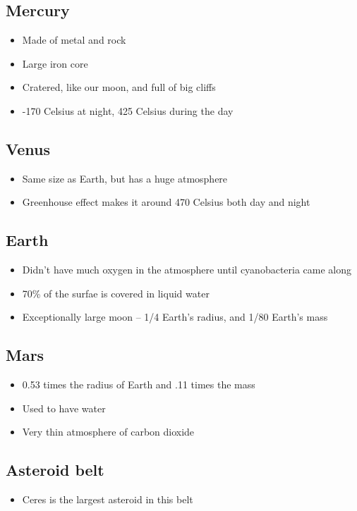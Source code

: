 \documentclass[class=article, crop=false]{standalone}
\begin{document}
\subsection{Mercury}
\begin{itemize}
    \item Made of metal and rock
    \item Large iron core
    \item Cratered, like our moon, and full of big cliffs
    \item -170 Celsius at night, 425 Celsius during the day
\end{itemize}
\subsection{Venus}
\begin{itemize}
    \item Same size as Earth, but has a huge atmosphere
    \item Greenhouse effect makes it around 470 Celsius both day and night
\end{itemize}
\subsection{Earth}
\begin{itemize}
    \item Didn't have much oxygen in the atmosphere until cyanobacteria came along
    \item 70\% of the surfae is covered in liquid water
    \item Exceptionally large moon -- 1/4 Earth's radius, and 1/80 Earth's mass
\end{itemize}
\subsection{Mars}
\begin{itemize}
    \item 0.53 times the radius of Earth and .11 times the mass
    \item Used to have water
    \item Very thin atmosphere of carbon dioxide
\end{itemize}
\subsection{Asteroid belt}
\begin{itemize}
    \item Ceres is the largest asteroid in this belt
\end{itemize}
\end{document}
